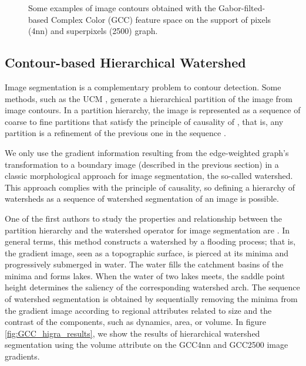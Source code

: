 \documentclass[journal]{IEEEtran}
\begin{document}
\begin{figure}[!ht]
	\caption{Some examples of image contours obtained with the Gabor-filted-based Complex Color (GCC) feature space on the support of pixels (4nn) and superpixels (2500) graph.}\label{fig:GCC_results}    
\end{figure}


\subsection{Contour-based Hierarchical Watershed}

Image segmentation is a complementary problem to contour detection. Some methods, such as the UCM \cite{Arbelaez.Maire.ea:PR:2009}, generate a hierarchical partition of the image from image contours. In a partition hierarchy, the image is represented as a sequence of coarse to fine partitions that satisfy the principle of causality of \cite{Koenderink:BC:1984}, that is, any partition is a refinement of the previous one in the sequence \cite{Perret.Cousty.ea:TIP:2018}.

We only use the gradient information resulting from the edge-weighted graph's transformation to a boundary image (described in the previous section) in a classic morphological approach for image segmentation, the so-called watershed. This approach complies with the principle of causality, so defining a hierarchy of watersheds as a sequence of watershed segmentation of an image is possible. 

One of the first authors to study the properties and relationship between the partition hierarchy and the watershed operator for image segmentation are \cite{Najman.Schmitt:PAMI:1996}. In general terms, this method constructs a watershed by a flooding process; that is, the gradient image, seen as a topographic surface, is pierced at its minima and progressively submerged in water. The water fills the catchment basins of the minima and forms lakes. When the water of two lakes meets, the saddle point height determines the saliency of the corresponding watershed arch. The sequence of watershed segmentation is obtained by sequentially removing the minima from the gradient image according to regional attributes related to size and the contrast of the components, such as dynamics, area, or volume. In figure \ref{fig:GCC_higra_results}, we show the results of hierarchical watershed segmentation using the volume attribute on the GCC4nn and GCC2500 image gradients. 
\end{document}
